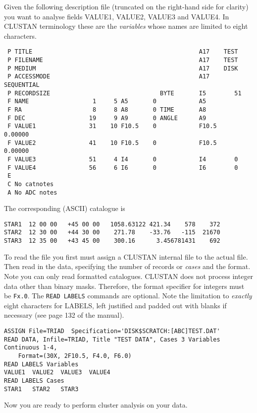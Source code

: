 Given the following description file (truncated on the right-hand side
for clarity) you want to analyse fields VALUE1,
VALUE2, VALUE3 and VALUE4.  In {\small CLUSTAN} terminology these are
the {\em variables} whose names are limited to eight characters.
\begin{verbatim}
 P TITLE                                               A17    TEST
 P FILENAME                                            A17    TEST
 P MEDIUM                                              A17    DISK
 P ACCESSMODE                                          A17    SEQUENTIAL
 P RECORDSIZE                               BYTE       I5        51
 F NAME                  1     5 A5       0            A5
 F RA                    8     8 A8       0 TIME       A8
 F DEC                  19     9 A9       0 ANGLE      A9
 F VALUE1               31    10 F10.5    0            F10.5     0.00000
 F VALUE2               41    10 F10.5    0            F10.5     0.00000
 F VALUE3               51     4 I4       0            I4        0
 F VALUE4               56     6 I6       0            I6        0
 E
 C No catnotes
 A No ADC notes
\end{verbatim}
The corresponding (ASCII) catalogue is
\begin{verbatim}
STAR1  12 00 00   +45 00 00   1058.63122 421.34    578    372
STAR2  12 30 00   +44 30 00    271.78    -33.76   -115  21670
STAR3  12 35 00   +43 45 00    300.16      3.456781431    692
\end{verbatim}
To read the file you first must assign a {\small CLUSTAN} internal
file to the actual file.  Then read in the data, specifying the number
of records or {\em cases} and the format.  Note you can only read
formatted catalogues. {\small CLUSTAN} does not process integer data
other than binary masks.  Therefore, the format specifier for integers must be
{\tt Fx.0}. The {\tt READ LABELS} commands are optional.  Note the
limitation to {\em exactly} eight characters for LABELS, left justified and
padded out with blanks if necessary (see page 132 of the manual).

\begin{verbatim}
ASSIGN File=TRIAD  Specification='DISK$SCRATCH:[ABC]TEST.DAT'
READ DATA, Infile=TRIAD, Title "TEST DATA", Cases 3 Variables Continuous 1-4,
    Format=(30X, 2F10.5, F4.0, F6.0)
READ LABELS Variables
VALUE1  VALUE2  VALUE3  VALUE4
READ LABELS Cases
STAR1   STAR2   STAR3
\end{verbatim}
Now you are ready to perform cluster analysis on your data.

